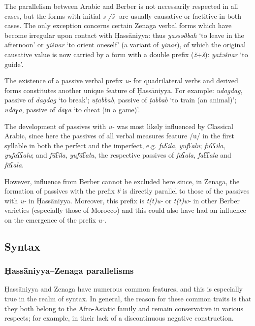 \documentclass[output=paper]{langsci/langscibook}
\begin{document}
The parallelism between Arabic and Berber is not necessarily respected in all cases, but the forms with initial \textit{s-/š-} are usually causative or factitive in both cases. The only exception concerns certain Zenaga verbal forms which have become irregular upon contact with Ḥassāniyya: thus \textit{yassəðbah} ‘to leave in the afternoon’ or \textit{yišnar} ‘to orient oneself’ (a variant of \textit{yinar}), of which the original causative value is now carried by a form with a double prefix (\textit{ž}+\textit{š}): \textit{yažəšnar} ‘to guide’.


The existence of a passive verbal prefix \textit{u-} for quadrilateral verbs and derived forms constitutes another unique feature of Ḥassāniyya. For example: \textit{udagdag}, passive of \textit{dagdag} ‘to break’; \textit{uṭabbab}, passive of \textit{ṭabbab} ‘to train (an animal)’; \textit{udāɣa}, passive of \textit{dāɣa} ‘to cheat (in a game)’.

The development of passives with \textit{u-} was most likely influenced by Classical Arabic, since here the passives of all verbal measures feature /u/ in the first syllable in both the perfect and the imperfect, e.g. \textit{fuʕila}, \textit{yu}\textit{fʕalu}; \textit{fuʕʕila}, \textit{yu}\textit{faʕʕalu}; and \textit{fūʕila}, \textit{yu}\textit{fāʕalu}, the respective passives of \textit{faʕala}, \textit{faʕʕala} and \textit{fāʕala}.

However, influence from Berber cannot be excluded here since, in Zenaga, the formation of passives with the prefix \textit{tʲ} is directly parallel to those of the passives with \textit{u-} in Ḥassāniyya. Moreover, this prefix is \textit{t(t)u-} or \textit{t(t)w-} in other Berber varieties (especially those of Morocco) and this could also have had an influence on the emergence of the prefix \textit{u-}. 

\subsection{ Syntax} %

\subsubsection{ Ḥassāniyya–Zenaga parallelisms} %

Ḥassāniyya and Zenaga have numerous common features, and this is especially true in the realm of syntax. In general, the reason for these common traits is that they both belong to the Afro-Asiatic family and remain conservative in various respects; for example, in their lack of a discontinuous negative construction.
\end{document}
